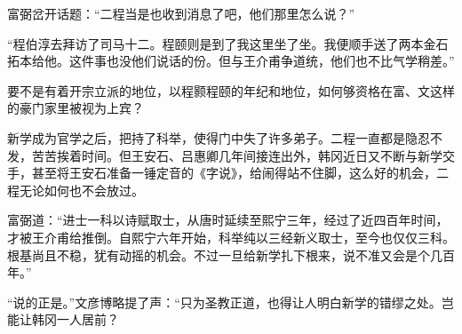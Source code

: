 富弼岔开话题：“二程当是也收到消息了吧，他们那里怎么说？”

“程伯淳去拜访了司马十二。程颐则是到了我这里坐了坐。我便顺手送了两本金石拓本给他。这件事也没他们说话的份。但与王介甫争道统，他们也不比气学稍差。”

要不是有着开宗立派的地位，以程颢程颐的年纪和地位，如何够资格在富、文这样的豪门家里被视为上宾？

新学成为官学之后，把持了科举，使得门中失了许多弟子。二程一直都是隐忍不发，苦苦挨着时间。但王安石、吕惠卿几年间接连出外，韩冈近日又不断与新学交手，甚至将王安石准备一锤定音的《字说》，给闹得站不住脚，这么好的机会，二程无论如何也不会放过。

富弼道：“进士一科以诗赋取士，从唐时延续至熙宁三年，经过了近四百年时间，才被王介甫给推倒。自熙宁六年开始，科举纯以三经新义取士，至今也仅仅三科。根基尚且不稳，犹有动摇的机会。不过一旦给新学扎下根来，说不准又会是个几百年。”

“说的正是。”文彦博略提了声：“只为圣教正道，也得让人明白新学的错缪之处。岂能让韩冈一人居前？

